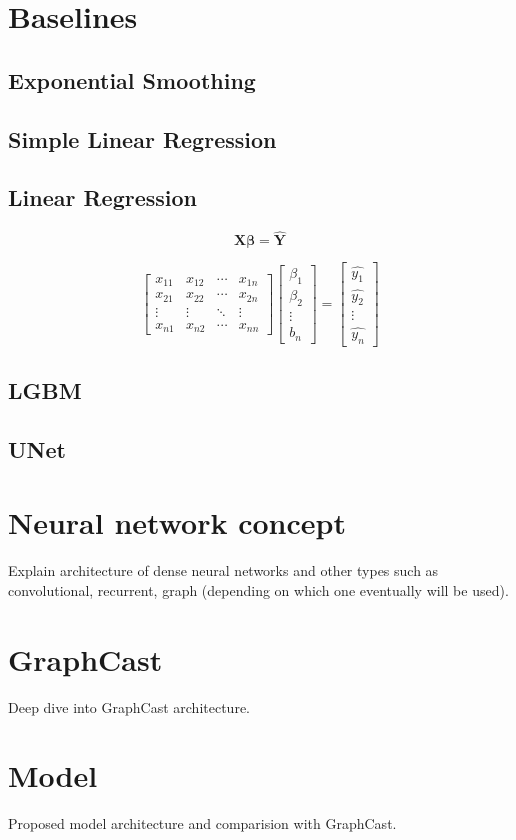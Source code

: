  \section{Baselines}
 \subsection{Exponential Smoothing}
 \subsection{Simple Linear Regression}
 \subsection{Linear Regression}
 
 \[
    \mathbf{X} \boldsymbol\beta = \mathbf{\hat{Y}}
 \]
 
 \[
    \begin{bmatrix}
    x_{11} & x_{12} & \cdots & x_{1n}\\
    x_{21} & x_{22} & \cdots & x_{2n}\\
    \vdots & \vdots & \ddots & \vdots\\
    x_{n1} & x_{n2} & \cdots & x_{nn}
    \end{bmatrix}
    \begin{bmatrix}
    \beta_1\\\beta_2\\ \vdots\\b_n
    \end{bmatrix}
    =\begin{bmatrix}
    \hat{y_1}\\\hat{y_2}\\ \vdots\\\hat{y_n}
    \end{bmatrix}
\]
 \subsection{LGBM}
 \subsection{UNet}


\section{Neural network concept}
Explain architecture of dense neural networks and other types such as convolutional, recurrent, graph (depending on which one eventually will be used).

\section{GraphCast}
Deep dive into GraphCast architecture.

\section{Model}
Proposed model architecture and comparision with GraphCast. 
	